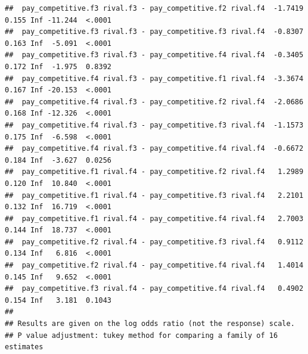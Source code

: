 \documentclass[
]{article}
\begin{document}
\begin{verbatim}
##  pay_competitive.f3 rival.f3 - pay_competitive.f2 rival.f4  -1.7419 0.155 Inf -11.244  <.0001
##  pay_competitive.f3 rival.f3 - pay_competitive.f3 rival.f4  -0.8307 0.163 Inf  -5.091  <.0001
##  pay_competitive.f3 rival.f3 - pay_competitive.f4 rival.f4  -0.3405 0.172 Inf  -1.975  0.8392
##  pay_competitive.f4 rival.f3 - pay_competitive.f1 rival.f4  -3.3674 0.167 Inf -20.153  <.0001
##  pay_competitive.f4 rival.f3 - pay_competitive.f2 rival.f4  -2.0686 0.168 Inf -12.326  <.0001
##  pay_competitive.f4 rival.f3 - pay_competitive.f3 rival.f4  -1.1573 0.175 Inf  -6.598  <.0001
##  pay_competitive.f4 rival.f3 - pay_competitive.f4 rival.f4  -0.6672 0.184 Inf  -3.627  0.0256
##  pay_competitive.f1 rival.f4 - pay_competitive.f2 rival.f4   1.2989 0.120 Inf  10.840  <.0001
##  pay_competitive.f1 rival.f4 - pay_competitive.f3 rival.f4   2.2101 0.132 Inf  16.719  <.0001
##  pay_competitive.f1 rival.f4 - pay_competitive.f4 rival.f4   2.7003 0.144 Inf  18.737  <.0001
##  pay_competitive.f2 rival.f4 - pay_competitive.f3 rival.f4   0.9112 0.134 Inf   6.816  <.0001
##  pay_competitive.f2 rival.f4 - pay_competitive.f4 rival.f4   1.4014 0.145 Inf   9.652  <.0001
##  pay_competitive.f3 rival.f4 - pay_competitive.f4 rival.f4   0.4902 0.154 Inf   3.181  0.1043
## 
## Results are given on the log odds ratio (not the response) scale. 
## P value adjustment: tukey method for comparing a family of 16 estimates
\end{verbatim}
\end{document}
